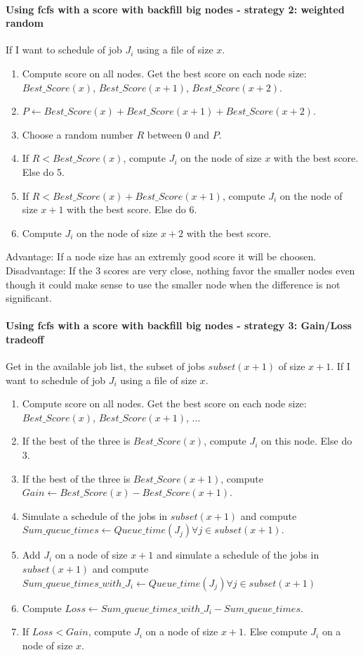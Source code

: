 \documentclass[a4paper]{article}
\begin{document}
\paragraph{Using fcfs with a score with backfill big nodes - strategy 2: weighted random}
If I want to schedule of job $J_i$ using a file of size $x$.
\begin{enumerate}
	\item Compute score on all nodes. Get the best score on each node size: $Best\_Score(x)$, $Best\_Score(x+1)$, $Best\_Score(x+2)$.
	\item $P \gets Best\_Score(x) + Best\_Score(x+1) + Best\_Score(x+2)$.
	\item Choose a random number $R$ between 0 and $P$.
	\item If $R < Best\_Score(x)$, compute $J_i$ on the node of size $x$ with the best score. Else do 5.
	\item If $R < Best\_Score(x) + Best\_Score(x+1)$, compute $J_i$ on the node of size $x+1$ with the best score. Else do 6.
	\item Compute $J_i$ on the node of size $x+2$ with the best score.
\end{enumerate}
Advantage: If a node size has an extremly good score it will be choosen.\\
Disadvantage: If the 3 scores are very close, nothing favor the smaller nodes even though it could make sense to use the smaller node when the difference is not significant.

\paragraph{Using fcfs with a score with backfill big nodes - strategy 3: Gain/Loss tradeoff}
Get in the available job list, the subset of jobs $subset(x+1)$ of size $x+1$.
If I want to schedule of job $J_i$ using a file of size $x$.
\begin{enumerate}
	\item Compute score on all nodes. Get the best score on each node size: $Best\_Score(x)$, $Best\_Score(x+1)$, ...
	\item If the best of the three is $Best\_Score(x)$, compute $J_i$ on this node. Else do 3.
	\item If the best of the three is $Best\_Score(x+1)$, compute $Gain \gets Best\_Score(x) - Best\_Score(x+1)$.
	\item Simulate a schedule of the jobs in $subset(x+1)$ and compute $Sum\_queue\_times \gets Queue\_time(J_j) \forall j \in subset(x+1)$.
	\item Add $J_i$ on a node of size $x+1$ and simulate a schedule of the jobs in $subset(x+1)$ and compute $Sum\_queue\_times\_with\_J_i \gets Queue\_time(J_j) \forall j \in subset(x+1)$
	\item Compute $Loss \gets Sum\_queue\_times\_with\_J_i - Sum\_queue\_times$.
	\item If $Loss < Gain$, compute $J_i$ on a node of size $x+1$. Else compute $J_i$ on a node of size $x$.
\end{enumerate}
\end{document}
